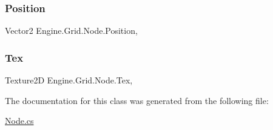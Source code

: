 \subsubsection{\texorpdfstring{Position}{Position}}
{\footnotesize\ttfamily Vector2 Engine.\+Grid.\+Node.\+Position\hspace{0.3cm}{\ttfamily [get]}, {\ttfamily [set]}}

\mbox{\label{a00414_a192207495540bfe40471c4721dbe2d01}} 
\subsubsection{\texorpdfstring{Tex}{Tex}}
{\footnotesize\ttfamily Texture2D Engine.\+Grid.\+Node.\+Tex\hspace{0.3cm}{\ttfamily [get]}, {\ttfamily [set]}}



The documentation for this class was generated from the following file\+:\begin{DoxyCompactItemize}
\item 
\hyperlink{a00092}{Node.\+cs}\end{DoxyCompactItemize}
